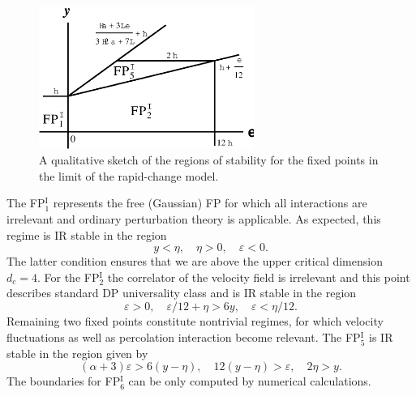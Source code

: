 \documentclass[aps,pre,url,twocolumn,superscriptaddress]{revtex4-1}
\def\eps{\varepsilon}
\newcommand{\fp}[2]{FP$^{\textrm{#1}}_{#2}$}
\begin{document}
\begin{figure}[h!]
  \includegraphics[width=7cm]{stab_RCH.eps}
  \caption{A qualitative sketch of the 
  regions of stability for the fixed points in the limit of the rapid-change model.}
  \label{fig:stab_rch}
\end{figure}

The \fp{I}{1} represents the free (Gaussian) FP for which all interactions are
irrelevant and ordinary perturbation theory is applicable.
As expected, this regime is IR stable  in the region
\begin{equation}
   y < \eta,\quad \eta>0,\quad \eps < 0.
   \label{eq:FPI1_region}
\end{equation}
  The latter condition ensures that we are above the upper
 critical dimension $d_c=4$.
For the \fp{I}{2} the correlator of the velocity field is irrelevant and 
this point describes standard DP universality class \cite{JanTau04} and is IR stable 
in the region
\begin{equation}
  \eps > 0,\quad \eps/12 + \eta > 6y,\quad \eps < \eta/12. 
  \label{eq:FPI2_region}
\end{equation} 
Remaining two fixed points constitute nontrivial regimes, for which velocity
fluctuations as well as percolation interaction become relevant.
The \fp{I}{5} is IR stable in the region given by
\begin{equation}
 (\alpha+3)\eps > 6(y-\eta),\quad 12(y-\eta)>\eps,\quad 2\eta>y.
 \label{eq:FPI5_region}
\end{equation}
The boundaries for \fp{I}{6} can be only computed by numerical calculations. 
\end{document}
